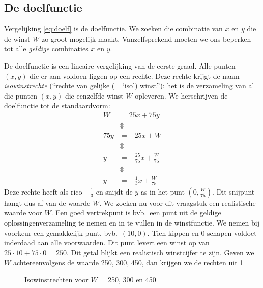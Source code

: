 \subsection{De doelfunctie}
Vergelijking \eqref{eq:doelf} is de doelfunctie. We zoeken die combinatie
van $x$ en $y$ die de winst $W$ zo groot mogelijk maakt.
Vanzelfsprekend moeten we ons beperken tot alle \emph{geldige} combinaties $x$
en $y$.

De doelfunctie is een lineaire
vergelijking van de eerste graad. Alle punten $(x, y)$
die er aan voldoen liggen op een rechte. Deze rechte krijgt de
naam \emph{isowinstrechte} (``rechte van gelijke (= `iso') winst''):
het is de verzameling van al die punten $(x, y)$ die eenzelfde
winst $W$ opleveren. We herschrijven de doelfunctie tot de
standaardvorm:
\begin{align*}
    W &=  25x+75y  \\
     & \Updownarrow    \\
    75y &=  -25x+W  \\
     & \Updownarrow    \\
    y &=  -\frac{25}{75}x+\frac{W}{75}  \\
     & \Updownarrow    \\
    y &=  -\frac{1}{3}x+\frac{W}{75}
\end{align*}
Deze rechte heeft als rico $-\frac{1}{3}$ en snijdt de $y$-as in het punt
$(0,\frac{W}{75})$. Dit snijpunt hangt dus af van de waarde $W$.
We zoeken nu voor dit vraagstuk een realistische waarde voor
$W$. Een goed vertrekpunt is bvb.\ een punt uit de geldige oplossingenverzameling
te nemen en in te vullen in de winstfunctie. We nemen 	
bij voorkeur een gemakkelijk punt, bvb.\ $(10, 0)$. Tien kippen
en 0 schapen voldoet inderdaad aan alle voorwaarden. Dit punt
levert een winst op van $25\cdot 10 + 75\cdot 0 = 250$.
Dit getal blijkt een realistisch
winstcijfer te zijn. Geven we $W$ achtereenvolgens de waarde
250,  300, 450, dan krijgen we de rechten
uit \cref{fig:isowinstrechten}
\begin{figure}[htbp]
    \centering
{}
    \caption{Isowinstrechten voor $W$ = 250, 300 en 450}
    \label{fig:isowinstrechten}
\end{figure}

